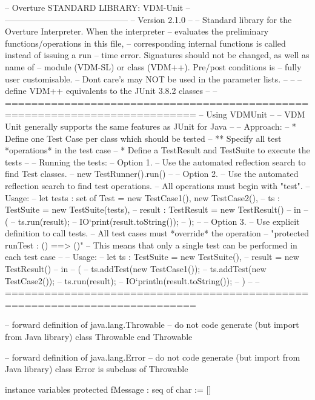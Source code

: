 \documentclass[a4paper]{article}
\begin{document}
\title{}
\author{}
\begin{vdm_al}
--  Overture STANDARD LIBRARY: VDM-Unit
--      --------------------------------------------
-- Version 2.1.0 
--
-- Standard library for the Overture Interpreter. When the interpreter
-- evaluates the preliminary functions/operations in this file,
-- corresponding internal functions is called instead of issuing a run
-- time error. Signatures should not be changed, as well as name of
-- module (VDM-SL) or class (VDM++). Pre/post conditions is 
-- fully user customisable. 
-- Dont care's may NOT be used in the parameter lists.
--  
--
-- define VDM++ equivalents to the JUnit 3.8.2 classes
--
--===========================================================================
-- Using VDMUnit
--
-- VDM Unit generally supports the same features as JUnit for Java
--
-- Approach:
-- * Define one Test Case per class which should be tested
-- ** Specify all test *operations* in the test case
-- * Define a TestResult and TestSuite to execute the tests
--
-- Running the tests:
-- Option 1.
-- Use the automated reflection search to find Test classes.
--  new TestRunner().run()
--
-- Option 2.
-- Use the automated reflection search to find test operations.
--  All operations must begin with "test".
--  Usage:
--      let tests : set of Test = {new TestCase1(), new TestCase2()},
--          ts : TestSuite = new TestSuite(tests),
--          result : TestResult = new TestResult()
--      in
--      (
--          ts.run(result);
--          IO`print(result.toString());
--      );
--
-- Option 3.
-- Use explicit definition to call tests.
--  All test cases must *override* the operation 
--      "protected runTest : () ==> ()"
--  This means that only a single test can be performed in each test case
--
-- Usage:
--      let ts : TestSuite = new TestSuite(),
--          result = new TestResult() 
--      in
--      (
--          ts.addTest(new TestCase1());
--          ts.addTest(new TestCase2());
--          ts.run(result);
--          IO`println(result.toString());
--      )
--
--===========================================================================



-- forward definition of java.lang.Throwable
-- do not code generate (but import from Java library)
class Throwable
end Throwable

-- forward definition of java.lang.Error
-- do not code generate (but import from Java library)
class Error is subclass of Throwable

instance variables
  protected fMessage : seq of char := []
  

\end{vdm_al}
\end{document}
